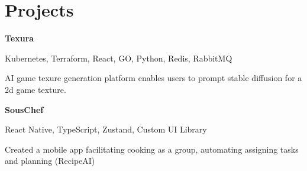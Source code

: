 
\newenvironment{twocolentry_proj}[2][]{
    \onecolentry
    \def\secondColumn{#2}
    \setcolumnwidth{\fill, 7 cm}
    \begin{paracol}{2}
}{
    \switchcolumn \raggedleft \secondColumn
    \end{paracol}
    \endonecolentry
} %

\vspace{5 pt - 0.5 cm}
\section{Projects}
\begin{twocolentry_proj}{
    \mbox{}
}
\fontsize{11 pt}{11 pt}\textbf{Texura}
\end{twocolentry_proj}

\begin{onecolentry}
    Kubernetes, Terraform, React, GO, Python, Redis, RabbitMQ
    \begin{highlights}
        \item AI game texure generation platform enables users to prompt stable diffusion for a 2d game texture.
    \end{highlights}
\end{onecolentry}



\vspace{0.10 cm}
\begin{twocolentry_proj}{
    \mbox{}%
}
\fontsize{11 pt}{11 pt}\textbf{SousChef}
\end{twocolentry_proj}
\begin{onecolentry}
    React Native, TypeScript, Zustand, Custom UI Library  
    \begin{highlights}
        \item Created a mobile app facilitating cooking as a group, automating assigning tasks and planning (RecipeAI)
    \end{highlights}
\end{onecolentry}


